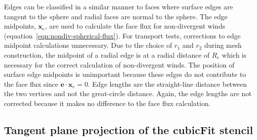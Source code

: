 Edges can be classified in a similar manner to faces where surface edges are tangent to the sphere and radial faces are normal to the sphere.  The edge midpoints, $\mathbf{x}_e$, are used to calculate the face flux for non-divergent winds (equation~\eqref{eqn:nondiv-spherical-flux}).
For transport tests, corrections to edge midpoint calculations unnecessary.  Due to the choice of $r_1$ and $r_2$ during mesh construction, the midpoint of a radial edge is at a radial distance of $R_e$ which is necessary for the correct calculation of non-divergent winds.
The position of surface edge midpoints is unimportant because these edges do not contribute to the face flux since $\mathbf{e} \cdot \mathbf{x}_e = 0$.
Edge lengths are the straight-line distance between the two vertices and not the great-circle distance.  Again, the edge lengths are not corrected because it makes no difference to the face flux calculation.

\subsection*{Tangent plane projection of the cubicFit stencil}
